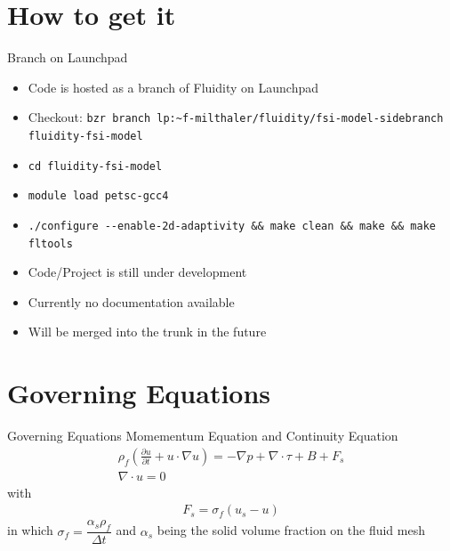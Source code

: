 \documentclass[	%
	bigger, %
	hyperref, %
	xcolor,	%
	t,		%
]{beamer}
\begin{document}
\section{How to get it}
\begin{frame}{Branch on Launchpad}

\begin{itemize}
  \item Code is hosted as a branch of Fluidity on Launchpad
  \item Checkout: \lstinline{bzr branch lp:~f-milthaler/fluidity/fsi-model-sidebranch fluidity-fsi-model}
  \pause
  \item \lstinline{cd fluidity-fsi-model}
  \item \lstinline{module load petsc-gcc4}
  \item \lstinline{./configure --enable-2d-adaptivity && make clean && make && make fltools}
  \pause
  \item Code/Project is still under development
  \item Currently no documentation available
  \item Will be merged into the trunk in the future
\end{itemize}

\end{frame}






\section{Governing Equations}

\begin{frame}{Governing Equations}
 Momementum Equation and Continuity Equation
 \begin{gather}
  \rho_f\left(\frac{\partial u}{\partial t} + u\cdot\nabla u\right) = -\nabla p + \nabla\cdot\tau + B +F_s \\
  \nabla\cdot u = 0
 \end{gather}
with
 \begin{gather}
   F_s = \sigma_f \left( u_s - u\right)
 \end{gather}
in which $\sigma_f = \dfrac{\alpha_s\rho_f}{\Delta t}$ and $\alpha_s$ being the solid volume fraction on the fluid mesh
\end{frame}
\end{document}
